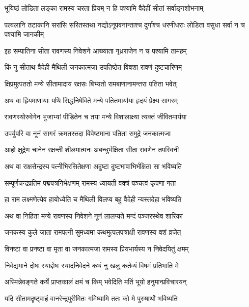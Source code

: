 \twolineshloka
{भूयिष्ठं लोडिता लङ्का रामस्य चरता प्रियम्}
{न हि पश्यामि वैदेहीं सीतां सर्वाङ्गशोभनाम्} %

\threelineshloka
{पल्वलानि तटाकानि सरांसि सरितस्तथा}
{नद्योऽनूपवनान्ताश्च दुर्गाश्च धरणीधराः}
{लोडिता वसुधा सर्वा न च पश्यामि जानकीम्} %

\twolineshloka
{इह सम्पातिना सीता रावणस्य निवेशने}
{आख्याता गृध्रराजेन न च पश्यामि तामहम्} %

\twolineshloka
{किं नु सीताथ वैदेही मैथिली जनकात्मजा}
{उपतिष्ठेत विवशा रावणं दुष्टचारिणम्} %

\twolineshloka
{क्षिप्रमुत्पततो मन्ये सीतामादाय रक्षसः}
{बिभ्यतो रामबाणानामन्तरा पतिता भवेत्} %

\twolineshloka
{अथ वा ह्रियमाणायाः पथि सिद्धनिषेविते}
{मन्ये पतितमार्याया हृदयं प्रेक्ष्य सागरम्} %

\twolineshloka
{रावणस्योरुवेगेन भुजाभ्यां पीडितेन च}
{तया मन्ये विशालाक्ष्या त्यक्तं जीवितमार्यया} %

\twolineshloka
{उपर्युपरि वा नूनं सागरं क्रमतस्तदा}
{विवेष्टमाना पतिता समुद्रे जनकात्मजा} %

\twolineshloka
{आहो क्षुद्रेण चानेन रक्षन्ती शीलमात्मनः}
{अबन्धुर्भक्षिता सीता रावणेन तपस्विनी} %

\twolineshloka
{अथ वा राक्षसेन्द्रस्य पत्नीभिरसितेक्षणा}
{अदुष्टा दुष्टभावाभिर्भक्षिता सा भविष्यति} %

\twolineshloka
{सम्पूर्णचन्द्रप्रतिमं पद्मपत्रनिभेक्षणम्}
{रामस्य ध्यायती वक्त्रं पञ्चत्वं कृपणा गता} %

\twolineshloka
{हा राम लक्ष्मणेत्येव हायोध्येति च मैथिली}
{विलप्य बहु वैदेही न्यस्तदेहा भविष्यति} %

\twolineshloka
{अथ वा निहिता मन्ये रावणस्य निवेशने}
{नूनं लालप्यते मन्दं पञ्जरस्थेव शारिका} %

\twolineshloka
{जनकस्य कुले जाता रामपत्नी सुमध्यमा}
{कथमुत्पलपत्राक्षी रावणस्य वशं व्रजेत्} %

\twolineshloka
{विनष्टा वा प्रनष्टा वा मृता वा जनकात्मजा}
{रामस्य प्रियभार्यस्य न निवेदयितुं क्षमम्} %

\twolineshloka
{निवेद्यमाने दोषः स्याद्दोषः स्यादनिवेदने}
{कथं नु खलु कर्तव्यं विषमं प्रतिभाति मे} %

\twolineshloka
{अस्मिन्नेवङ्गते कर्ये प्राप्तकालं क्षमं च किम्}
{भवेदिति मतिं भूयो हनुमान्प्रविचारयन्} %

\twolineshloka
{यदि सीतामदृष्ट्वाहं वानरेन्द्रपुरीमितः}
{गमिष्यामि ततः को मे पुरुषार्थो भविष्यति} %

